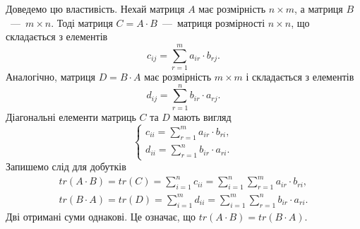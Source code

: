 Доведемо цю властивість.
Нехай матриця $A$ має розмірність $n \times m$, а матриця $B$~---~$m \times n$.
Тоді матриця $C = A \cdot B$~---~матриця розмірності $n \times n$,
що складається з елементів
\begin{equation*}
  c_{ij} =
  \sum \limits_{r = 1}^m a_{ir} \cdot b_{rj}.
\end{equation*}
Аналогічно,
матриця $D = B \cdot A$ має розмірність $m \times m$ і складається з елементів
\begin{equation*}
  d_{ij} =
  \sum \limits_{r = 1}^n b_{ir} \cdot a_{rj}.
\end{equation*}
Діагональні елементи матриць $C$ та $D$ мають вигляд
\begin{equation*}
  \begin{cases}
    c_{ii} = \sum \limits_{r = 1}^m a_{ir} \cdot b_{ri}, \\
    d_{ii} = \sum \limits_{r = 1}^n b_{ir} \cdot a_{ri}.
  \end{cases}
\end{equation*}
Запишемо слід для добутків
\begin{equation*}
  \begin{gathered}
    tr \left( A \cdot B \right) = tr \left( C \right) = \sum \limits_{i = 1}^n c_{ii} =
    \sum \limits_{i = 1}^n \sum \limits_{r = 1}^m a_{ir} \cdot b_{ri}, \\
    tr \left( B \cdot A \right) = tr \left( D \right) = \sum \limits_{i = 1}^m d_{ii} =
    \sum \limits_{i = 1}^m \sum \limits_{r = 1}^n b_{ir} \cdot a_{ri}.
  \end{gathered}
\end{equation*}
Дві отримані суми однакові.
Це означає, що $tr \left( A \cdot B \right) = tr \left( B \cdot A \right) $.

